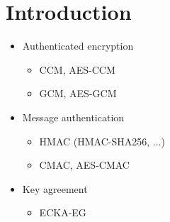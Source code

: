 
\chapter{Introduction}
\label{chap:introduction}

\begin{itemize}

    \item Authenticated encryption

        \begin{itemize}
            \item CCM, AES-CCM
            \item GCM, AES-GCM
        \end{itemize}

    \item Message authentication

        \begin{itemize}
            \item HMAC (HMAC-SHA256, $\ldots$)
            \item CMAC, AES-CMAC
        \end{itemize}

    \item Key agreement

        \begin{itemize}
            \item ECKA-EG
        \end{itemize}



\end{itemize}

